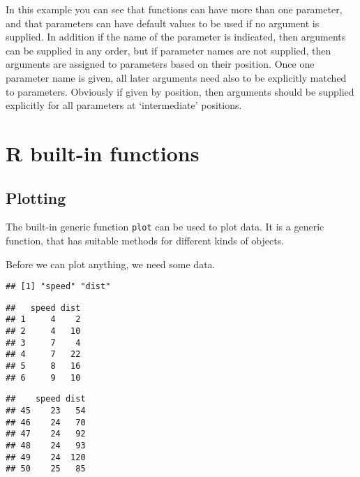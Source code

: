 \documentclass[paper=a4,10pt,div=17,headsepline,BCOR=12mm,twoside,open=right]{scrbook}\usepackage{knitr}
\begin{document}
In this example you can see that functions can have more than one parameter, and that parameters can have default values to be used if no argument is supplied. In addition if the name of the parameter is indicated, then arguments can be supplied in any order, but if parameter names are not supplied, then arguments are assigned to parameters based on their position. Once one parameter name is given, all later arguments need also to be explicitly matched to parameters. Obviously if given by position, then arguments should be supplied explicitly for all parameters at `intermediate' positions.

\section{R built-in functions}

\subsection{Plotting}

The built-in generic function \texttt{plot} can be used to plot data. It is a generic function, that has suitable methods for different kinds of objects.

Before we can plot anything, we need some data.

\begin{knitrout}\footnotesize
{}\color{fgcolor}\begin{kframe}
\begin{alltt}
\end{alltt}
\begin{verbatim}
## [1] "speed" "dist"
\end{verbatim}
\begin{alltt}
\end{alltt}
\begin{verbatim}
##   speed dist
## 1     4    2
## 2     4   10
## 3     7    4
## 4     7   22
## 5     8   16
## 6     9   10
\end{verbatim}
\begin{alltt}
\end{alltt}
\begin{verbatim}
##    speed dist
## 45    23   54
## 46    24   70
## 47    24   92
## 48    24   93
## 49    24  120
## 50    25   85
\end{verbatim}
\end{kframe}
\end{knitrout}
\end{document}
